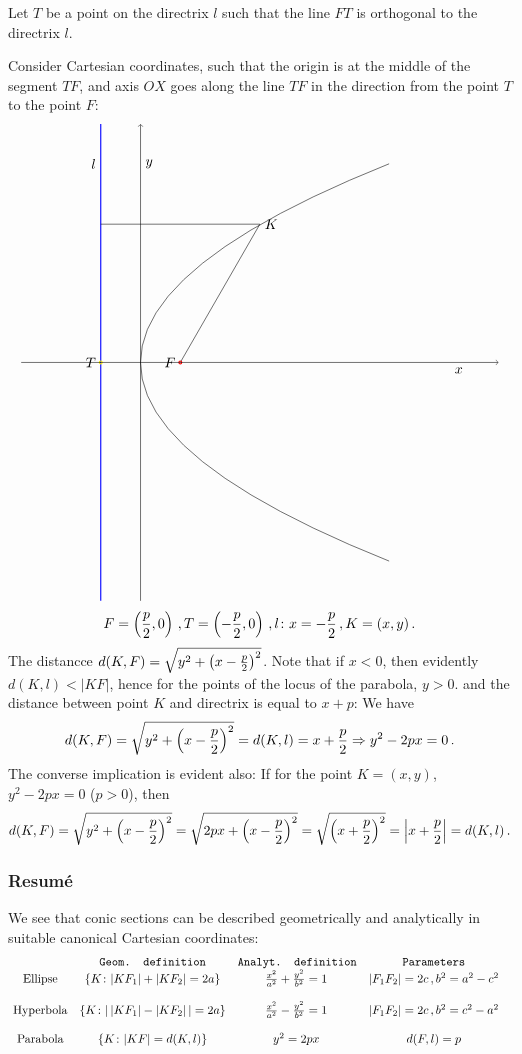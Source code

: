 \documentclass[12pt]{article}
\numberwithin{equation}{section}
\begin{document}
Let
$T$ be a point on the directrix $l$ such that
the line $FT$ is orthogonal to the directrix $l$.


Consider Cartesian coordinates, such that
the origin is at the middle of the segment $TF$,
and axis  $OX$ goes  along the line $TF$ in the direction
from the point $T$ to the point  $F$:
\begin{equation*}\label{secondparabola}
\begin{tikzpicture}%
    \draw [domain=-5:5] plot ({0.25*\x*\x-3},\x);
\draw [ thick, blue] (-4,-6)--(-4,6); 
\node [left] at (-4,5) {$l$};
\draw  (-2,0)--(0,3.48)--(-4,3.48);
\node [right] at (0,3.48) {$K$};
\draw[red,thick] (-2,0) circle (1pt); 
\node [left] at (-2,0) {$F$};
\draw[yellow,thick] (-4,0) circle (1pt); 
\node [left] at (-4,0) {$T$};
   \draw       [->] (-6,0)--(0,0)--(6,0); 
   \draw       [->] (-3,-6)--(-3,0)--(-3,6); 
 \node [below] at (5,0)   {$x$};    
 \node  [right] at (-3,5) {$y$};    
\end{tikzpicture}
\end{equation*}
      $$
F=\left({p\over 2},0\right)\,, 
T=\left(-{p\over 2},0\right)\,, 
l\colon x=-{p\over 2}\,, K=(x,y)\,.
      $$
The distancce $d(K,F)=\sqrt {y^2+\left(x-{p\over 2}\right)^2}$.
Note that if  $x<0$, then evidently  $d(K,l)<|KF|$,
hence for the points of the locus of the parabola, $y>0$.
and the distance between point $K$ and directrix 
is equal to $x+p$:  We have
      $$
d(K,F)=\sqrt {y^2+\left(x-{p\over 2}\right)^2}=
d(K,l)=
x+{p\over 2}\Rightarrow  y^2-2px=0\,.
      $$
The converse implication is evident also: If 
for the point $K=(x,y)$, $y^2-2px=0$ ($p>0$), then
         $$
d(K,F)=
\sqrt{y^2+\left(x-{p\over 2}\right)^2}=
\sqrt{2px+\left(x-{p\over 2}\right)^2}=
\sqrt{\left(x+{p\over 2}\right)^2}=
\left|x+{p\over 2}\right|=d(K,l)\,.
         $$
\subsubsection {Resum\'e}\label{resume}

We see that conic sections can be described geometrically
and analytically in suitable canonical Cartesian coordinates:
        \begin{equation}\label{canonicalparameters}
        \begin{matrix}
 &    \hbox{{\tt Geom. definition}}  
&     \hbox{{\tt Analyt.  definition}}  
&     \hbox{{\tt Parameters}} & \cr
\hbox { Ellipse} 
&\{K\colon |KF_1|+|KF_2|=2a\} 
& {x^2\over a^2}+{y^2\over b^2}=1\,
&  |F_1F_2|=2c\,, b^2=a^2-c^2\cr 
\phantom {dfffff}\cr
\hbox { Hyperbola} 
&\{K\colon |\,|KF_1|-|KF_2|\,|=2a\} 
& {x^2\over a^2}-{y^2\over b^2}=1\,
&  |F_1F_2|=2c\,, b^2=c^2-a^2\cr 
\phantom {dfffff}\cr
\hbox { Parabola} 
&\{K\colon |KF|=d(K,l)\} 
& y^2=2px\,
&  d(F,l)=p\cr  
         \end{matrix}
  \end{equation}
\end{document}
